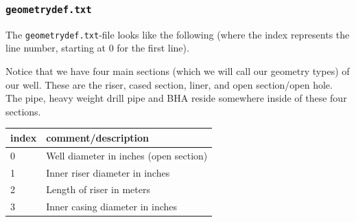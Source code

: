 \hypertarget{geometrydef.txt}{%
\subsubsection{\texorpdfstring{\texttt{geometrydef.txt}}{geometrydef.txt}}\label{geometrydef.txt}}

The \texttt{geometrydef.txt}-file looks like the following (where the
index represents the line number, starting at 0 for the first line).

Notice that we have four main sections (which we will call our geometry
types) of our well. These are the riser, cased section, liner, and open
section/open hole. The pipe, heavy weight drill pipe and BHA reside
somewhere inside of these four sections.

\begin{longtable}[]{@{}ll@{}}
\toprule
\begin{minipage}[b]{0.06\columnwidth}\raggedright
index\strut
\end{minipage} & \begin{minipage}[b]{0.89\columnwidth}\raggedright
comment/description\strut
\end{minipage}\tabularnewline
\midrule
\endhead
\begin{minipage}[t]{0.06\columnwidth}\raggedright
0\strut
\end{minipage} & \begin{minipage}[t]{0.89\columnwidth}\raggedright
Well diameter in inches (open section)\strut
\end{minipage}\tabularnewline
\begin{minipage}[t]{0.06\columnwidth}\raggedright
1\strut
\end{minipage} & \begin{minipage}[t]{0.89\columnwidth}\raggedright
Inner riser diameter in inches\strut
\end{minipage}\tabularnewline
\begin{minipage}[t]{0.06\columnwidth}\raggedright
2\strut
\end{minipage} & \begin{minipage}[t]{0.89\columnwidth}\raggedright
Length of riser in meters\strut
\end{minipage}\tabularnewline
\begin{minipage}[t]{0.06\columnwidth}\raggedright
3\strut
\end{minipage} & \begin{minipage}[t]{0.89\columnwidth}\raggedright
Inner casing diameter in inches\strut
\end{minipage}\tabularnewline

\end{longtable}
